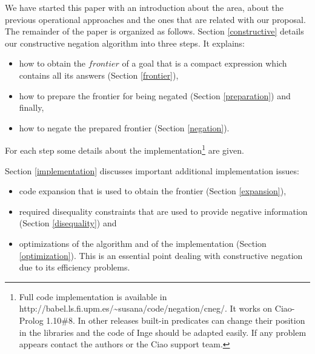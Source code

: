 \documentclass{tlp}
\begin{document}

We have started this paper with an introduction about the area, about
the previous operational approaches and the ones that are related with
our proposal. The remainder of the paper is organized as
follows. Section \ref{constructive} details our constructive negation
algorithm into three steps. It explains:
\begin{itemize} 
      \item how to obtain the $frontier$ of a goal that is a compact
expression which contains all its answers (Section \ref{frontier}),
      \item how to prepare the frontier for being negated (Section
\ref{preparation}) and finally,
      \item how to negate the prepared frontier (Section \ref{negation}).
\end{itemize} 
For each step some details about the implementation\footnote{Full code
  implementation is available in
  http://babel.ls.fi.upm.es/\~{}susana/code/negation/cneg/. It works
  on Ciao-Prolog 1.10\#8. In other releases built-in predicates can
  change their position in the libraries and the code of Inge should
  be adapted easily. If any problem appears contact the authors or
  the Ciao support team.} are given.

Section \ref{implementation} discusses important additional implementation issues: 
\begin{itemize} 
      \item code expansion that is used to obtain the frontier (Section
\ref{expansion}),
      \item required disequality constraints that are used to provide negative
information (Section \ref{disequality}) and
      \item optimizations of the algorithm and of the implementation (Section
\ref{optimization}). This is an essential point dealing with constructive
negation due to its efficiency problems.
\end{itemize} 
\end{document}
